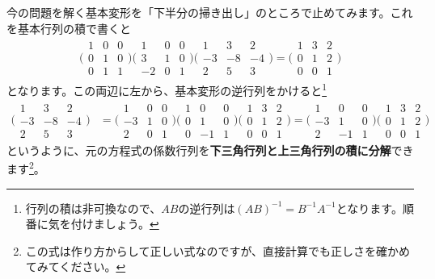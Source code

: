 今の問題を解く基本変形を「下半分の掃き出し」のところで止めてみます。これを基本行列の積で書くと
\begin{align*}
\Biggl(
\begin{array}{rrr}
1 & 0 & 0 \\
0 & 1 & 0 \\
0 & 1 & 1 
\end{array}
\Biggr)
\Biggl(
\begin{array}{rrr}
1 & 0 & 0 \\
3 & 1 & 0 \\
-2 & 0 & 1 
\end{array}
\Biggr)
\Biggl(
\begin{array}{rrr}
1 & 3 & 2 \\
-3 & -8 & -4 \\
2 & 5 & 3 
\end{array}
\Biggr)
=
\Biggl(
\begin{array}{rrr}
1 & 3 & 2 \\
0 & 1 & 2 \\
0 & 0 & 1 
\end{array}
\Biggr)
\end{align*}
となります。この両辺に左から、基本変形の逆行列をかけると\footnote{行列の積は非可換なので、$AB$の逆行列は$(AB)^{-1} = B^{-1}A^{-1}$となります。順番に気を付けましょう。}
\begin{align*}
\Biggl(
\begin{array}{rrr}
1 & 3 & 2 \\
-3 & -8 & -4 \\
2 & 5 & 3 
\end{array}
\Biggr)
&=
\Biggl(
\begin{array}{rrr}
1 & 0 & 0 \\
-3 & 1 & 0 \\
2 & 0 & 1 
\end{array}
\Biggr)
\Biggl(
\begin{array}{rrr}
1 & 0 & 0 \\
0 & 1 & 0 \\
0 & -1 & 1 
\end{array}
\Biggr)
\Biggl(
\begin{array}{rrr}
1 & 3 & 2 \\
0 & 1 & 2 \\
0 & 0 & 1 
\end{array}
\Biggr)
=
\Biggl(
\begin{array}{rrr}
1 & 0 & 0 \\
-3 & 1 & 0 \\
2 & -1 & 1 
\end{array}
\Biggr)
\Biggl(
\begin{array}{rrr}
1 & 3 & 2 \\
0 & 1 & 2 \\
0 & 0 & 1 
\end{array}
\Biggr)
\end{align*}
というように、元の方程式の係数行列を\textbf{下三角行列と上三角行列の積に分解}できます\footnote{この式は作り方からして正しい式なのですが、直接計算でも正しさを確かめてみてください。}。

